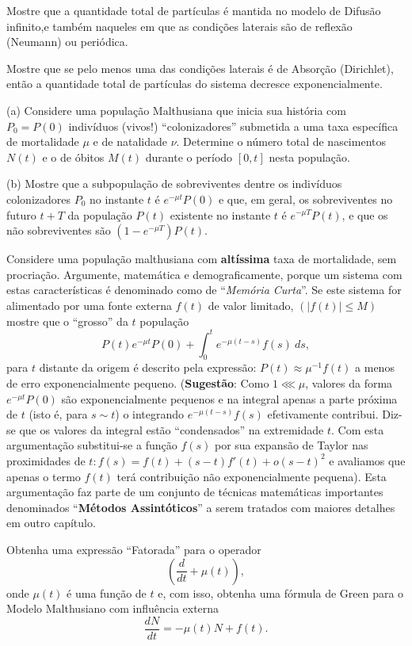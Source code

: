\begin{exercise}
Mostre que a quantidade total de partículas é mantida no modelo de Difusão infinito,e também naqueles em que as condições laterais são de reflexão (Neumann) ou periódica. 
\end{exercise}

\begin{exercise}
Mostre que se pelo menos uma das condições laterais é de Absorção (Dirichlet), então a quantidade total de partículas do sistema decresce exponencialmente. 
\end{exercise}




\begin{exercise} \quad

\begin{description}
\item (a) Considere uma população Malthusiana que inicia sua história com \(P_0 = P(0)\) indivíduos (vivos!) ``colonizadores'' submetida a uma taxa específica de mortalidade \(\mu\) e de natalidade \(\nu\). Determine o número total de nascimentos \(N(t)\) e o de óbitos \(M(t)\) durante o período \([0,t]\) nesta população.

\item (b) Mostre que a subpopulação de sobreviventes dentre os indivíduos colonizadores \(P_0\) no instante \(t\) é \(e^{-\mu t} P(0)\) e que, em geral, os sobreviventes no futuro \(t+T\) da população \(P(t)\) existente no instante \(t\) é \(e^{-\mu T} P(t)\), e que os não sobreviventes são \((1-e^{-\mu T}) P(t)\).
\end{description}
\end{exercise}

\begin{exercise}
Considere uma população malthusiana com \textbf{altíssima} taxa de mortalidade, sem procriação. Argumente, matemática e demograficamente, porque um sistema com estas características é denominado como de ``\textit{Memória Curta}''. Se este sistema for alimentado por uma fonte externa \(f(t)\) de valor limitado, \((|f(t)| \le M)\) mostre que o ``grosso'' da \(t\) população
\[P(t) e^{-\mu t} P(0) + \int_{0}^{t} e^{-\mu(t-s)} f(s)\ ds,\]
para \(t\) distante da origem é descrito pela expressão: \(P(t) \approx \mu^{-1} f(t)\) a menos de erro exponencialmente pequeno. (\textbf{Sugestão}: Como \(1 \lll \mu\), valores da forma \(e^{-\mu t} P(0)\) são exponencialmente pequenos e na integral apenas a parte próxima de \(t\) (isto é, para \(s \sim t\)) o integrando \(e^{-\mu(t-s)} f(s)\) efetivamente contribui. Diz-se que os valores da integral estão ``condensados'' na extremidade \(t\). Com esta argumentação substitui-se a função \(f(s)\) por sua expansão de Taylor nas proximidades de \(t: f(s) = f(t)+(s-t) f'(t)+o(s-t)^2\) e avaliamos que apenas o termo \(f(t)\) terá contribuição não exponencialmente pequena). Esta argumentação faz parte de um conjunto de técnicas matemáticas importantes denominados ``\textbf{Métodos Assintóticos}'' a serem tratados com maiores detalhes em outro capítulo.
\end{exercise}

\begin{exercise}
Obtenha uma expressão ``Fatorada'' para o operador
\[\left(\dfrac{d}{dt} + \mu(t)\right),\]
onde \(\mu(t)\) é uma função de \(t\) e, com isso, obtenha uma fórmula de Green para o Modelo Malthusiano com influência externa
\[\dfrac{dN}{dt} = -\mu(t)N + f(t).\]
\end{exercise}



